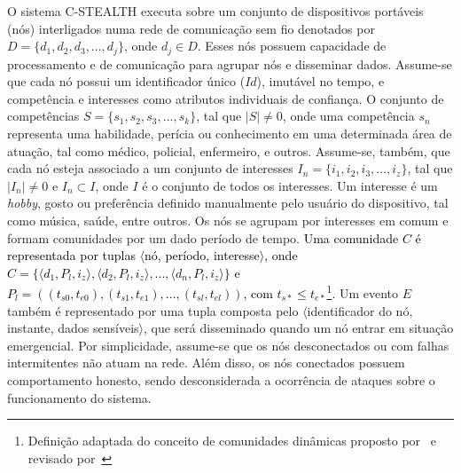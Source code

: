 \documentclass[12pt]{article}
\newcommand{\mn}[1]{\textcolor{red}{\bf [Michele]: #1}}
\newcommand{\rev}[1]{\textcolor{black}{{#1}}}
\begin{document}
O sistema \mbox{C-STEALTH} executa sobre um conjunto de dispositivos portáveis (nós) interligados numa rede de comunicação sem fio denotados por $D = \{d_1, d_2, d_3, ..., d_j\}$, onde $d_j \in D$. Esses nós possuem capacidade de processamento e de comunicação para agrupar nós e disseminar dados. Assume-se que cada nó possui um identificador único ($Id$), imutável no tempo, %
e competência e interesses como atributos individuais de confiança. O conjunto de competências $S =  \{s_1, s_2, s_3, ..., s_k\}$, tal que $|S| \neq 0$, onde  uma competência $s_n$ representa uma habilidade, perícia ou conhecimento em uma determinada área de atuação, tal como médico, policial, enfermeiro, e outros. Assume-se, também, que cada nó esteja associado a %
um conjunto de interesses $I_n = \{i_1, i_2, i_3, ..., i_z\}$, tal que $|I_n| \neq 0$ e $I_n \subset I$, onde $I$ é o conjunto de todos os interesses. Um interesse é um \textit{hobby}, gosto ou preferência definido
manualmente
pelo usuário do dispositivo, tal como música, saúde, entre outros. Os nós se agrupam por interesses em comum e formam comunidades por um dado período de tempo. \rev{Uma comunidade $C$ é representada por %
tuplas %
$\langle$nó, período, interesse$\rangle$, onde $C = \{\langle d_1,P_l,i_z\rangle, \langle d_2,P_l,i_z\rangle, ..., \langle d_n,P_l,i_z\rangle\}$ e $P_l=((t_{s0},t_{e0}),(t_{s1},t_{e1}),..., (t_{sl},t_{el})) $, com $t_{s*} \leq t_{e*}$\footnote{Definição adaptada do conceito de comunidades dinâmicas proposto por~\cite{coscia2011} e revisado por~\cite{rossetti2018community}}.}
Um evento $E$ também é representado por uma tupla composta pelo
$\langle$identificador do nó, instante, dados sensíveis$\rangle$, que será disseminado quando um nó entrar em situação emergencial. Por simplicidade, assume-se que os nós desconectados ou com falhas intermitentes não atuam na rede. Além disso, os nós conectados possuem comportamento honesto, sendo desconsiderada a ocorrência de ataques sobre o funcionamento do sistema. 
\end{document}

